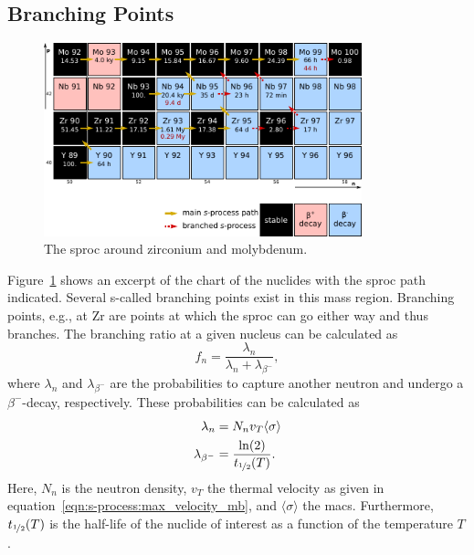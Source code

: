 \subsection{Branching Points}

\begin{figure}[tb]
    \centering
    \includegraphics[width=0.82\textwidth]{graphics/s-process/zrmo_chartnuc}
    \caption{The \ac{sproc} around zirconium and molybdenum.}
    \label{fig:s-process:zrmo_chartnuc}
\end{figure}
Figure~\ref{fig:s-process:zrmo_chartnuc} shows an excerpt of the chart of the nuclides with the \ac{sproc} path indicated. Several s-called branching points exist in this mass region. Branching points, e.g., at Zr are points at which the \ac{sproc} can go either way and thus branches. 
The branching ratio at a given nucleus can be calculated as
\begin{equation}
    f_n = \frac{\lambda_n}{\lambda_n + \lambda_{\beta^{-}}},
\end{equation}
where $\lambda_n$ and $\lambda_{\beta^{-}}$ are the probabilities to capture another neutron and undergo a $\beta^{-}$-decay, respectively. These probabilities can be calculated as
\begin{align}
    \lambda_n &= N_n v_T \langle \sigma \rangle \\
    \lambda_{\beta^{-}} &= \frac{\ln(2)}{t_{\nicefrac{1}{2}}(T)}.
\end{align}
Here, $N_n$ is the neutron density, $v_T$ the thermal velocity as given in equation~\eqref{eqn:s-process:max_velocity_mb}, and $\langle\sigma\rangle$ the \ac{macs}. Furthermore, $t_{\nicefrac{1}{2}}(T)$ is the half-life of the nuclide of interest as a function of the temperature $T$.
